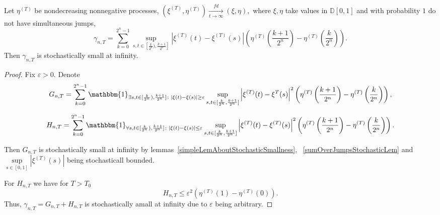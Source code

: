 \documentclass[12pt, a4paper, titlepage]{article}
\begin{document}
  \begin{lem}\label{mostSubtleCharacteristicsGammaNTLem}
  Let $\eta^{(T)}$ be nondecreasing nonnegative processes, 
  $(\xi^{(T)}, \eta^{(T)})\xrightarrow[t\to\infty]{fd} (\xi, \eta),$
  where $\xi, \eta$ take values in $\mathbb{D}[0,1]$
  and with probability $1$ do not have simultaneous jumps,  
  $$\gamma_{n,T}=\sum\limits_{k=0}^{2^n-1}
  \sup\limits_{s,t \in [\frac{k}{2^n}), \frac{k+1}{2^n}]}
  \left|\xi^{(T)}(t)-\xi^{(T)}(s)\right|
  \left(\eta^{(T)}\left(\frac{k+1}{2^n}\right)-\eta^{(T)}\left(\frac{k}{2^n}\right)\right).$$
    Then $\gamma_{n,T}$ is stochastically small at infinity.  
 \end{lem}
 \begin{proof}  
 Fix $\varepsilon>0$. Denote
 $$G_{n, T} = \sum\limits_{k=0}^{2^n-1} \mathbbm{1}_{\exists s, t \in [\frac{k}{2^n}), \frac{k+1}{2^n}] \colon
 |\xi(t)-\xi(s)| \ge \varepsilon}
  \sup\limits_{s,t \in [\frac{k}{2^n}, \frac{k+1}{2^n}]}  
   \left|\xi^{(T)}(t)-\xi^{T}(s)\right|^2
  \left(\eta^{(T)}\left(\frac{k+1}{2^n}\right)-\eta^{(T)}\left(\frac{k}{2^n}\right)\right),$$
 
 $$H_{n, T} = \sum\limits_{k=0}^{2^n-1}
  \mathbbm{1}_{\forall s, t \in [\frac{k}{2^n}), \frac{k+1}{2^n}] \colon |\xi(t)-\xi(s)| \le \varepsilon}
  \sup\limits_{s,t \in [\frac{k}{2^n}, \frac{k+1}{2^n}]}  
  \left|\xi^{(T)}(t)-\xi^{(T)}(s)\right|^2
  \left(\eta^{(T)}\left(\frac{k+1}{2^n}\right)-\eta^{(T)}\left(\frac{k}{2^n}\right)\right).$$
  
  Then $G_{n, T}$ is stochastically small at infinity
  by lemmas~\ref{simpleLemAboutStochasticSmallness},
  ~\ref{sumOverJumpsStochasticLem} 
  and $\sup\limits_{s\in [0,1]}|\xi^{(T)}(s)|$
  being stochasticall bounded. 
  
  For $H_{n, T}$ we have for $T>T_0$
  $$
   H_{n, T} \le \varepsilon^2 \left(\eta^{(T)}(1)-\eta^{(T)}(0)\right).
  $$
  Thus, $\gamma_{n,T}=G_{n,T}+H_{n,T}$ is stochastically amall at infinity
  due to $\varepsilon$ being arbitrary.  
 \end{proof}
 
\end{document}
